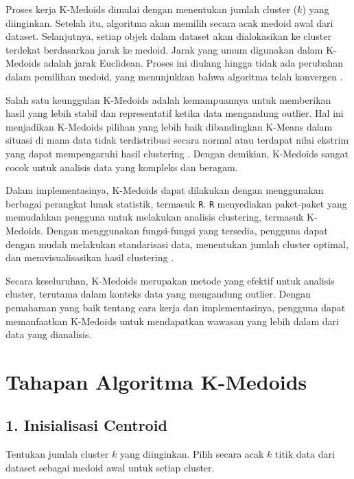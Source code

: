 \documentclass[
  oneside]{book}
\begin{document}
Proses kerja K-Medoids dimulai dengan menentukan jumlah cluster (\(k\)) yang diinginkan. Setelah itu, algoritma akan memilih secara acak medoid awal dari dataset. Selanjutnya, setiap objek dalam dataset akan dialokasikan ke cluster terdekat berdasarkan jarak ke medoid. Jarak yang umum digunakan dalam K-Medoids adalah jarak Euclidean. Proses ini diulang hingga tidak ada perubahan dalam pemilihan medoid, yang menunjukkan bahwa algoritma telah konvergen \citep{setyawati2017analisis}.

Salah satu keunggulan K-Medoids adalah kemampuannya untuk memberikan hasil yang lebih stabil dan representatif ketika data mengandung outlier. Hal ini menjadikan K-Medoids pilihan yang lebih baik dibandingkan K-Means dalam situasi di mana data tidak terdistribusi secara normal atau terdapat nilai ekstrim yang dapat mempengaruhi hasil clustering \citep{vercellis2009sistem}. Dengan demikian, K-Medoids sangat cocok untuk analisis data yang kompleks dan beragam.

Dalam implementasinya, K-Medoids dapat dilakukan dengan menggunakan berbagai perangkat lunak statistik, termasuk \texttt{R}. \texttt{R} menyediakan paket-paket yang memudahkan pengguna untuk melakukan analisis clustering, termasuk K-Medoids. Dengan menggunakan fungsi-fungsi yang tersedia, pengguna dapat dengan mudah melakukan standarisasi data, menentukan jumlah cluster optimal, dan memvisualisasikan hasil clustering \citep{santoso2012aplikasi}.

Secara keseluruhan, K-Medoids merupakan metode yang efektif untuk analisis cluster, terutama dalam konteks data yang mengandung outlier. Dengan pemahaman yang baik tentang cara kerja dan implementasinya, pengguna dapat memanfaatkan K-Medoids untuk mendapatkan wawasan yang lebih dalam dari data yang dianalisis.

\section{Tahapan Algoritma K-Medoids}\label{tahapan-algoritma-k-medoids}

\subsection*{1. Inisialisasi Centroid}\label{inisialisasi-centroid-1}

Tentukan jumlah cluster \(k\) yang diinginkan. Pilih secara acak \(k\) titik data dari dataset sebagai medoid awal untuk setiap cluster.
\end{document}
